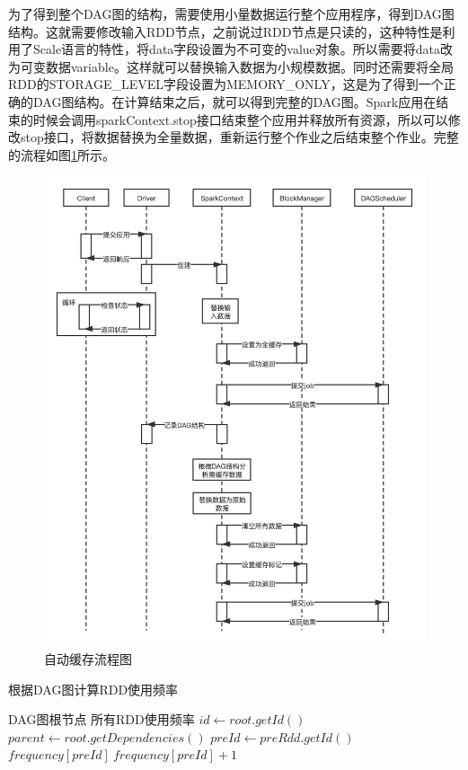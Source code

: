 为了得到整个DAG图的结构，需要使用小量数据运行整个应用程序，得到DAG图结构。这就需要修改输入RDD节点，之前说过RDD节点是只读的，这种特性是利用了Scale语言的特性，将data字段设置为不可变的value对象。所以需要将data改为可变数据variable。这样就可以替换输入数据为小规模数据。同时还需要将全局RDD的STORAGE\_LEVEL字段设置为MEMORY\_ONLY，这是为了得到一个正确的DAG图结构。在计算结束之后，就可以得到完整的DAG图。Spark应用在结束的时候会调用sparkContext.stop接口结束整个应用并释放所有资源，所以可以修改stop接口，将数据替换为全量数据，重新运行整个作业之后结束整个作业。完整的流程如图\ref{fig:auto-cache}所示。

\begin{figure}
    \centering
    \includegraphics[width=1\textwidth]{Img/自动缓存流程图.png}
    \caption{自动缓存流程图}
    \label{fig:auto-cache}
\end{figure}

\begin{algorithm}  
    \caption{根据DAG图计算RDD使用频率}  
    \begin{algorithmic}[1] %
        \Require DAG图根节点
        \Ensure 所有RDD使用频率
            \State $id \gets root.getId()$
            \State $parent \gets root.getDependencies()$
                \State $preId \gets preRdd.getId()$
                \State $frequency[preId] \ frequency[preId] + 1$
                \State {}
            \EndFor
        \EndFunction  
    \end{algorithmic}
    \label{alg:cal-fre}
\end{algorithm}

